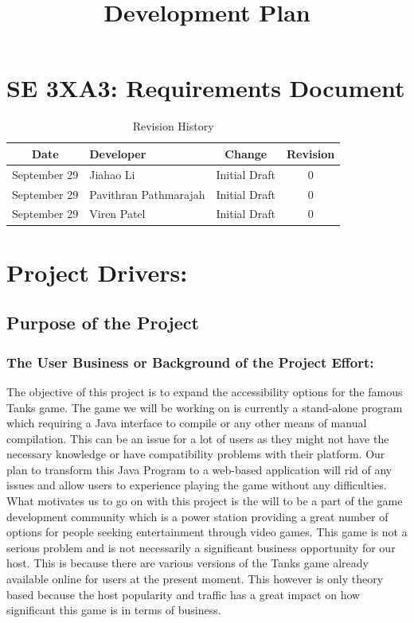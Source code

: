 \documentclass{article}
\begin{document}
\newpage
\title{Development Plan}
\hfill \break
\section*{SE 3XA3: Requirements Document}
\begin{table}[h!]
  \centering
  \caption{Revision History}
  \label{tab:table1}
  \begin{tabular}{clcc}
	\toprule
	Date &  Developer & Change & Revision\\
	\midrule
	September 29&Jiahao Li &Initial Draft &0\\
	September 29&Pavithran Pathmarajah &Initial Draft &0\\
	September 29&Viren Patel  &Initial Draft &0\\
	\bottomrule
  \end{tabular}
\end{table}



\newpage
{}
\tableofcontents
\newpage
\section{Project Drivers:}
\subsection{Purpose of the Project}

\subsubsection{The User Business or Background of the Project Effort:} The
objective of this project is to expand the accessibility options for the famous
Tanks game. The game we will be working on is currently a stand-alone program
which requiring a Java interface to compile or any other means of manual
compilation. This can be an issue for a lot of users as they might not have the
necessary knowledge or have compatibility problems with their platform. Our plan
to transform this Java Program to a web-based application will rid of any issues
and allow users to experience playing the game without any difficulties. What
motivates us to go on with this project is the will to be a part of the game
development community which is a power station providing a great number of
options for people seeking entertainment through video games. This game is not a
serious problem and is not necessarily a significant business opportunity for
our host. This is because there are various versions of the Tanks game already
available online for users at the present moment. This however is only theory
based because the host popularity and traffic has a great impact on how
significant this game is in terms of business.
\end{document}
